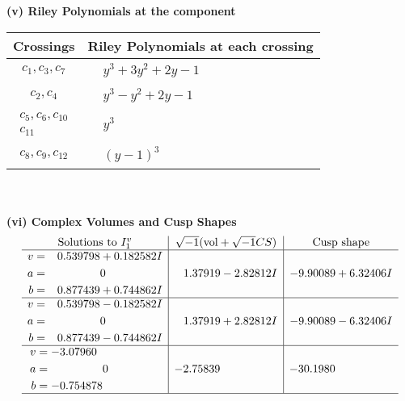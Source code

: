 \documentclass[1p]{elsarticle_modified}
\theoremstyle{definition}
\newcommand{\I}{\sqrt{-1}}
\begin{document}
\newpage\renewcommand{\arraystretch}{1}
\flushleft \textbf{(v) Riley Polynomials at the component}\newline \\
\begin{tabular}{m{50pt}|m{274pt}}
Crossings & \hspace{64pt}Riley Polynomials at each crossing \\
\hline $$\begin{aligned}c_{1},c_{3},c_{7}\end{aligned}$$&$\begin{aligned}
&y^3+3 y^2+2 y-1
\end{aligned}$\\
\hline $$\begin{aligned}c_{2},c_{4}\end{aligned}$$&$\begin{aligned}
&y^3- y^2+2 y-1
\end{aligned}$\\
\hline $$\begin{aligned}c_{5},c_{6},c_{10}\\c_{11}\end{aligned}$$&$\begin{aligned}
&y^3
\end{aligned}$\\
\hline $$\begin{aligned}c_{8},c_{9},c_{12}\end{aligned}$$&$\begin{aligned}
&(y-1)^3
\end{aligned}$\\
\hline
\end{tabular}\\~\\
\newpage\flushleft \textbf{(vi) Complex Volumes and Cusp Shapes}
$$\begin{array}{c|c|c}  
\text{Solutions to }I^v_{1}& \I (\text{vol} + \sqrt{-1}CS) & \text{Cusp shape}\\
 \hline 
\begin{aligned}
v &= \phantom{-}0.539798 + 0.182582 I \\
a &= \phantom{-0.000000 } 0 \\
b &= \phantom{-}0.877439 + 0.744862 I\end{aligned}
 & \phantom{-}1.37919 - 2.82812 I & -9.90089 + 6.32406 I \\ \hline\begin{aligned}
v &= \phantom{-}0.539798 - 0.182582 I \\
a &= \phantom{-0.000000 } 0 \\
b &= \phantom{-}0.877439 - 0.744862 I\end{aligned}
 & \phantom{-}1.37919 + 2.82812 I & -9.90089 - 6.32406 I \\ \hline\begin{aligned}
v &= -3.07960\phantom{ +0.000000I} \\
a &= \phantom{-0.000000 } 0 \\
b &= -0.754878\phantom{ +0.000000I}\end{aligned}
 & -2.75839\phantom{ +0.000000I} & -30.1980\phantom{ +0.000000I}\\
 \hline 
 \end{array}$$\newpage
\end{document}
